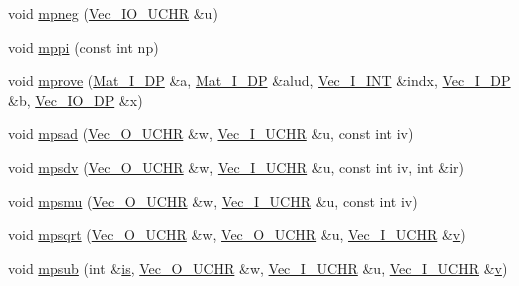 \begin{DoxyCompactItemize}
\item 
void \mbox{\hyperlink{namespaceNR_a685e7aacef1a2fa63acc2b0075848293}{mpneg}} (\mbox{\hyperlink{namespaceNR_ad0cd08c957bbfcd9b612069da683fed4}{Vec\+\_\+\+I\+O\+\_\+\+U\+C\+HR}} \&u)
\item 
void \mbox{\hyperlink{namespaceNR_a994c170707a8aab5444d4d126e7a7d23}{mppi}} (const int np)
\item 
void \mbox{\hyperlink{namespaceNR_a0c4cae16b0250ecbf95693adf73c8bdc}{mprove}} (\mbox{\hyperlink{namespaceNR_a2b8abfda8fffad6ba0a1b5a4c0773dbf}{Mat\+\_\+\+I\+\_\+\+DP}} \&a, \mbox{\hyperlink{namespaceNR_a2b8abfda8fffad6ba0a1b5a4c0773dbf}{Mat\+\_\+\+I\+\_\+\+DP}} \&alud, \mbox{\hyperlink{namespaceNR_ae67ce7dc86a8a64a7ce73c3c030ff610}{Vec\+\_\+\+I\+\_\+\+I\+NT}} \&indx, \mbox{\hyperlink{namespaceNR_a9f943da53862537c552e2a770cb170ae}{Vec\+\_\+\+I\+\_\+\+DP}} \&b, \mbox{\hyperlink{namespaceNR_ab293e06a6bf799d8a7ed932b6852bcb8}{Vec\+\_\+\+I\+O\+\_\+\+DP}} \&x)
\item 
void \mbox{\hyperlink{namespaceNR_a73ec9a62342ed00c7ed70bfedecf5947}{mpsad}} (\mbox{\hyperlink{namespaceNR_ac322e5f1208609bf101390ed2495b7d5}{Vec\+\_\+\+O\+\_\+\+U\+C\+HR}} \&w, \mbox{\hyperlink{namespaceNR_ace0fbcd7daadfbf5e4e7db2a317a5b46}{Vec\+\_\+\+I\+\_\+\+U\+C\+HR}} \&u, const int iv)
\item 
void \mbox{\hyperlink{namespaceNR_afb23bc7a9b2440c5a3db4da885920358}{mpsdv}} (\mbox{\hyperlink{namespaceNR_ac322e5f1208609bf101390ed2495b7d5}{Vec\+\_\+\+O\+\_\+\+U\+C\+HR}} \&w, \mbox{\hyperlink{namespaceNR_ace0fbcd7daadfbf5e4e7db2a317a5b46}{Vec\+\_\+\+I\+\_\+\+U\+C\+HR}} \&u, const int iv, int \&ir)
\item 
void \mbox{\hyperlink{namespaceNR_a7e4bcd285f6961beca936346cd63f092}{mpsmu}} (\mbox{\hyperlink{namespaceNR_ac322e5f1208609bf101390ed2495b7d5}{Vec\+\_\+\+O\+\_\+\+U\+C\+HR}} \&w, \mbox{\hyperlink{namespaceNR_ace0fbcd7daadfbf5e4e7db2a317a5b46}{Vec\+\_\+\+I\+\_\+\+U\+C\+HR}} \&u, const int iv)
\item 
void \mbox{\hyperlink{namespaceNR_a73de1f888d26e631949996bd1e437659}{mpsqrt}} (\mbox{\hyperlink{namespaceNR_ac322e5f1208609bf101390ed2495b7d5}{Vec\+\_\+\+O\+\_\+\+U\+C\+HR}} \&w, \mbox{\hyperlink{namespaceNR_ac322e5f1208609bf101390ed2495b7d5}{Vec\+\_\+\+O\+\_\+\+U\+C\+HR}} \&u, \mbox{\hyperlink{namespaceNR_ace0fbcd7daadfbf5e4e7db2a317a5b46}{Vec\+\_\+\+I\+\_\+\+U\+C\+HR}} \&\mbox{\hyperlink{hadron__timeslice_8cc_a716fc87f5e814be3ceee2405ed6ff22a}{v}})
\item 
void \mbox{\hyperlink{namespaceNR_a6c829dc4c09a73a1c6f91c817b01bfd4}{mpsub}} (int \&\mbox{\hyperlink{x_8cc_a81abbbdef81e25584a2eab888e643d3d}{is}}, \mbox{\hyperlink{namespaceNR_ac322e5f1208609bf101390ed2495b7d5}{Vec\+\_\+\+O\+\_\+\+U\+C\+HR}} \&w, \mbox{\hyperlink{namespaceNR_ace0fbcd7daadfbf5e4e7db2a317a5b46}{Vec\+\_\+\+I\+\_\+\+U\+C\+HR}} \&u, \mbox{\hyperlink{namespaceNR_ace0fbcd7daadfbf5e4e7db2a317a5b46}{Vec\+\_\+\+I\+\_\+\+U\+C\+HR}} \&\mbox{\hyperlink{hadron__timeslice_8cc_a716fc87f5e814be3ceee2405ed6ff22a}{v}})

\end{DoxyCompactItemize}
